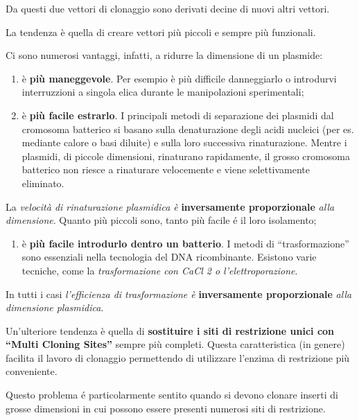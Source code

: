 \documentclass[11pt]{book}
\begin{document}
Da questi due vettori di clonaggio sono derivati decine di nuovi altri
vettori.

La tendenza è quella di creare vettori più piccoli e sempre più
funzionali.

Ci sono numerosi vantaggi, infatti, a ridurre la dimensione di un
plasmide:

\begin{enumerate}
\def\labelenumi{\arabic{enumi}.}
\itemsep1pt\parskip0pt
\item
  è \textbf{più maneggevole}. Per esempio è più difficile danneggiarlo o
  introdurvi interruzzioni a singola elica durante le manipolazioni
  sperimentali;
\item
  è \textbf{più facile estrarlo}. I principali metodi di separazione dei
  plasmidi dal cromosoma batterico si basano sulla denaturazione degli
  acidi nucleici (per es. mediante calore o basi diluite) e sulla loro
  successiva rinaturazione. Mentre i plasmidi, di piccole dimensioni,
  rinaturano rapidamente, il grosso cromosoma batterico non riesce a
  rinaturare velocemente e viene selettivamente eliminato.
\end{enumerate}

La \emph{velocità di rinaturazione plasmidica è} \textbf{inversamente
proporzionale} \emph{alla dimensione}. Quanto più piccoli sono, tanto
più facile é il loro isolamento;

\begin{enumerate}
\def\labelenumi{\arabic{enumi}.}
\setcounter{enumi}{2}
\itemsep1pt\parskip0pt
\item
  è \textbf{più facile introdurlo dentro un batterio}. I metodi di
  ``trasformazione'' sono essenziali nella tecnologia del DNA
  ricombinante. Esistono varie tecniche, come la \emph{trasformazione
  con CaCl 2 o l'elettroporazione}.
\end{enumerate}

In tutti i casi \emph{l'efficienza di trasformazione è}
\textbf{inversamente proporzionale} \emph{alla dimensione plasmidica}.

Un'ulteriore tendenza è quella di \textbf{sostituire i siti di
restrizione unici con ``Multi Cloning Sites''} sempre più completi.
Questa caratteristica (in genere) facilita il lavoro di clonaggio
permettendo di utilizzare l'enzima di restrizione più conveniente.

Questo problema é particolarmente sentito quando si devono clonare
inserti di grosse dimensioni in cui possono essere presenti numerosi
siti di restrizione.
\end{document}
